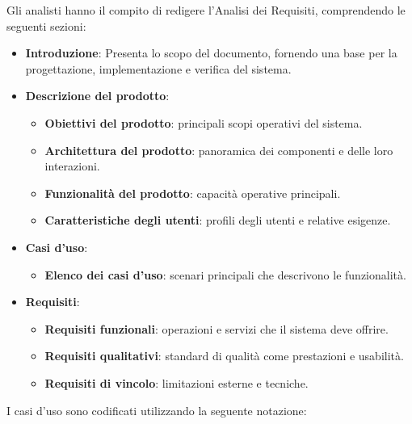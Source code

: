 Gli analisti hanno il compito di redigere l’Analisi dei Requisiti, comprendendo le seguenti
sezioni:

\begin{itemize}
    \item \textbf{Introduzione}:  
    Presenta lo scopo del documento, fornendo una base per la progettazione, implementazione e verifica del sistema.

    \item \textbf{Descrizione del prodotto}:  
    \begin{itemize}
        \item \textbf{Obiettivi del prodotto}: principali scopi operativi del sistema.
        \item \textbf{Architettura del prodotto}: panoramica dei componenti e delle loro interazioni.
        \item \textbf{Funzionalità del prodotto}: capacità operative principali.
        \item \textbf{Caratteristiche degli utenti}: profili degli utenti e relative esigenze.
    \end{itemize}

    \item \textbf{Casi d’uso}:  
    \begin{itemize}
        \item \textbf{Elenco dei casi d’uso}: scenari principali che descrivono le funzionalità.
    \end{itemize}

    \item \textbf{Requisiti}:  
    \begin{itemize}
        \item \textbf{Requisiti funzionali}: operazioni e servizi che il sistema deve offrire.
        \item \textbf{Requisiti qualitativi}: standard di qualità come prestazioni e usabilità.
        \item \textbf{Requisiti di vincolo}: limitazioni esterne e tecniche.
    \end{itemize}
\end{itemize}


I casi d'uso sono codificati utilizzando la seguente notazione:

